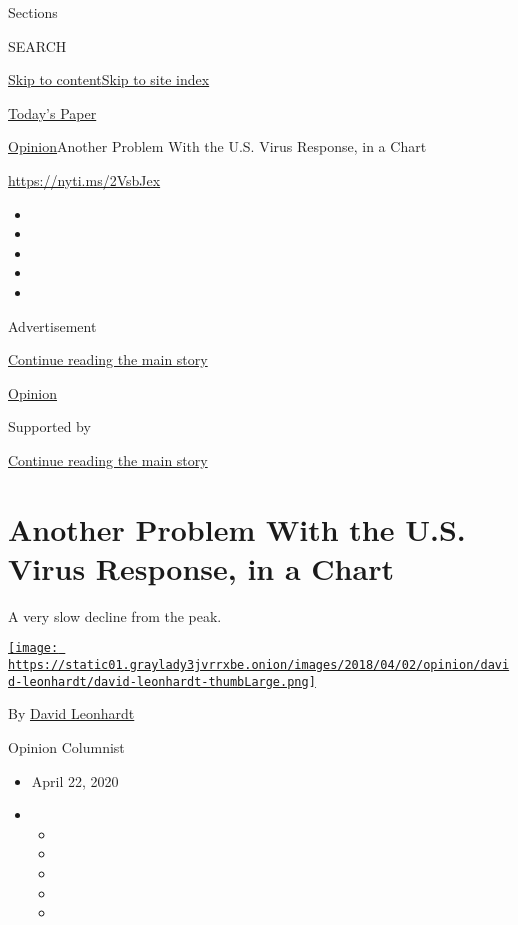 Sections

SEARCH

\protect\hyperlink{site-content}{Skip to
content}\protect\hyperlink{site-index}{Skip to site index}

\href{https://myaccount.nytimes3xbfgragh.onion/auth/login?response_type=cookie\&client_id=vi}{}

\href{https://www.nytimes3xbfgragh.onion/section/todayspaper}{Today's
Paper}

\href{/section/opinion}{Opinion}\textbar{}Another Problem With the U.S.
Virus Response, in a Chart

\url{https://nyti.ms/2VsbJex}

\begin{itemize}
\item
\item
\item
\item
\item
\end{itemize}

Advertisement

\protect\hyperlink{after-top}{Continue reading the main story}

\href{/section/opinion}{Opinion}

Supported by

\protect\hyperlink{after-sponsor}{Continue reading the main story}

\hypertarget{another-problem-with-the-us-virus-response-in-a-chart}{%
\section{Another Problem With the U.S. Virus Response, in a
Chart}\label{another-problem-with-the-us-virus-response-in-a-chart}}

A very slow decline from the peak.

\href{https://www.nytimes3xbfgragh.onion/by/david-leonhardt}{\texttt{[image: https://static01.graylady3jvrrxbe.onion/images/2018/04/02/opinion/david-leonhardt/david-leonhardt-thumbLarge.png]}}

By \href{https://www.nytimes3xbfgragh.onion/by/david-leonhardt}{David
Leonhardt}

Opinion Columnist

\begin{itemize}
\item
  April 22, 2020
\item
  \begin{itemize}
  \item
  \item
  \item
  \item
  \item
  \end{itemize}
\end{itemize}

